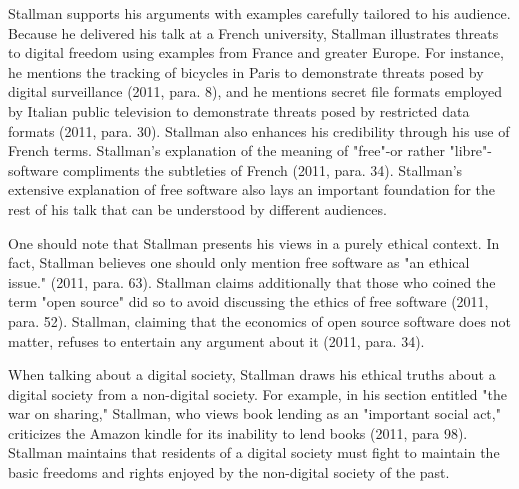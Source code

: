 Stallman supports his arguments with examples carefully tailored to his
audience. Because he delivered his talk at a French university, Stallman
illustrates threats to digital freedom using examples from France and greater
Europe. For instance, he mentions the tracking of bicycles in Paris to
demonstrate threats posed by digital surveillance (2011, para. 8), and he
mentions secret file formats employed by Italian public television to
demonstrate threats posed by restricted data formats (2011, para. 30).
Stallman also enhances his credibility through his use of French terms.
Stallman's explanation of the meaning of "free"-or rather "libre"-software
compliments the subtleties of French (2011, para. 34). Stallman's extensive
explanation of free software also lays an important foundation for the rest of
his talk that can be understood by different audiences.

One should note that Stallman presents his views in a purely ethical context.
In fact, Stallman believes one should only mention free software as "an ethical
issue." (2011, para. 63). Stallman claims additionally that those who coined
the term "open source" did so to avoid discussing the ethics of free software
(2011, para. 52). Stallman, claiming that the economics of open source software
does not matter, refuses to entertain any argument about it (2011, para. 34).

When talking about a digital society, Stallman draws his ethical truths about a
digital society from a non-digital society. For example, in his section
entitled "the war on sharing," Stallman, who views book lending as an
"important social act," criticizes the Amazon kindle for its inability to lend
books (2011, para 98). Stallman maintains that residents of a digital society
must fight to maintain the basic freedoms and rights enjoyed by the non-digital
society of the past.
